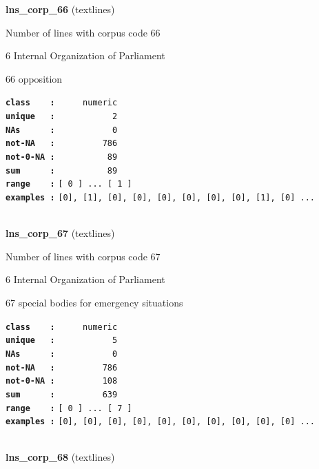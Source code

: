 \documentclass[]{article}
\begin{document}
\textbf{lns\_corp\_66} (textlines)

Number of lines with corpus code 66

6 Internal Organization of Parliament

66 opposition

\textbf{\texttt{class\ \ \ \ :}} \texttt{~~~~~numeric}\\
\textbf{\texttt{unique\ \ \ :}} \texttt{~~~~~~~~~~~2}\\
\textbf{\texttt{NAs\ \ \ \ \ \ :}} \texttt{~~~~~~~~~~~0}\\
\textbf{\texttt{not-NA\ \ \ :}} \texttt{~~~~~~~~~786}\\
\textbf{\texttt{not-0-NA\ :}} \texttt{~~~~~~~~~~89}\\
\textbf{\texttt{sum\ \ \ \ \ \ :}} \texttt{~~~~~~~~~~89}\\
\textbf{\texttt{range\ \ \ \ :}}
\texttt{{[}\ 0\ {]}\ ...\ {[}\ 1\ {]}}\\
\textbf{\texttt{examples\ :}}
\texttt{{[}0{]},\ {[}1{]},\ {[}0{]},\ {[}0{]},\ {[}0{]},\ {[}0{]},\ {[}0{]},\ {[}0{]},\ {[}1{]},\ {[}0{]}\ ...}\\

~

\textbf{lns\_corp\_67} (textlines)

Number of lines with corpus code 67

6 Internal Organization of Parliament

67 special bodies for emergency situations

\textbf{\texttt{class\ \ \ \ :}} \texttt{~~~~~numeric}\\
\textbf{\texttt{unique\ \ \ :}} \texttt{~~~~~~~~~~~5}\\
\textbf{\texttt{NAs\ \ \ \ \ \ :}} \texttt{~~~~~~~~~~~0}\\
\textbf{\texttt{not-NA\ \ \ :}} \texttt{~~~~~~~~~786}\\
\textbf{\texttt{not-0-NA\ :}} \texttt{~~~~~~~~~108}\\
\textbf{\texttt{sum\ \ \ \ \ \ :}} \texttt{~~~~~~~~~639}\\
\textbf{\texttt{range\ \ \ \ :}}
\texttt{{[}\ 0\ {]}\ ...\ {[}\ 7\ {]}}\\
\textbf{\texttt{examples\ :}}
\texttt{{[}0{]},\ {[}0{]},\ {[}0{]},\ {[}0{]},\ {[}0{]},\ {[}0{]},\ {[}0{]},\ {[}0{]},\ {[}0{]},\ {[}0{]}\ ...}\\

~

\textbf{lns\_corp\_68} (textlines)
\end{document}
